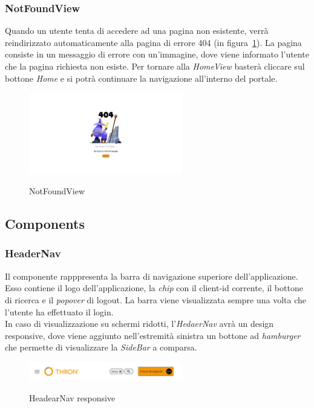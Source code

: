\subsubsection{NotFoundView}\label{subsubsec:not-found-view}
Quando un utente tenta di accedere ad una pagina non esistente, verrà reindirizzato automaticamente alla pagina di errore 404 (in figura~\ref{fig:not-found-view}).
La pagina consiste in un messaggio di errore con un'immagine, dove viene informato l'utente che la pagina richiesta non esiste.
Per tornare alla \textit{HomeView} basterà cliccare sul bottone \textit{Home} e si potrà continuare la navigazione all'interno del portale.

\begin{figure}[ht]
  \centering
  \includegraphics[width=0.6\textwidth, alt={Pagina di errore 404}]{images/frontend/NotFoundView.jpg}
  \caption{NotFoundView}\label{fig:not-found-view}
\end{figure}
\pagebreak
\subsection{Components}\label{subsec:components}

\subsubsection{HeaderNav}\label{subsubsec:header-nav}
Il componente rapppresenta la barra di navigazione superiore dell'applicazione. Esso contiene il logo dell'applicazione, la \textit{chip} con il client-id
corrente, il bottone di ricerca e il \textit{popover} di logout. 
La barra viene visualizzata sempre una volta che l'utente ha effettuato il login.\\
In caso di visualizzazione su schermi ridotti, l'\textit{HedaerNav} avrà un design responsive, dove viene aggiunto nell'estremità sinistra un bottone ad \textit{hamburger}
che permette di visualizzare la \textit{SideBar} a comparsa.

\begin{figure}[ht]
  \centering
  \includegraphics[width=0.6\textwidth, alt={Barra di navigazione superiore con design responsive}]{images/frontend/HeaderRes.jpg}
  \caption{HeadearNav responsive}\label{fig:header-nav-responsive}
\end{figure}

